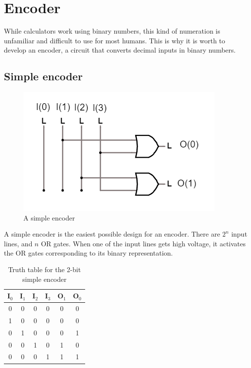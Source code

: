 \documentclass{article}
\begin{document}
\clearpage
\section{Encoder}

While calculators work using binary numbers, this kind of numeration is unfamiliar and difficult to use for most humans. This is why it is worth to develop an encoder, a circuit that converts decimal inputs in binary numbers.

\subsection{Simple encoder}

\begin{figure}[h]
  \centering
  \includegraphics[scale=0.7]{simple_encoder}
  \caption{A simple encoder}
  \label{simple_encoder}
\end{figure}

A simple encoder is the easiest possible design for an encoder. There are $2^n$ input lines, and $n$ OR gates. When one of the input lines gets high voltage, it activates the OR gates corresponding to its binary representation.

\begin{table}[h]
  \centering
  \begin{tabular}{| c | c | c | c || c | c |}
  \hline
  I$_0$ & I$_1$ & I$_2$ & I$_3$ & O$_1$ & O$_0$ \\ \hline
  0 & 0 & 0 & 0 & 0 & 0 \\ \hline
  1 & 0 & 0 & 0 & 0 & 0 \\ \hline
  0 & 1 & 0 & 0 & 0 & 1 \\ \hline
  0 & 0 & 1 & 0 & 1 & 0 \\ \hline
  0 & 0 & 0 & 1 & 1 & 1 \\ \hline
  \end{tabular}
  \caption{Truth table for the 2-bit simple encoder}
  \label{Table_simple_encoder}
\end{table}
\end{document}
